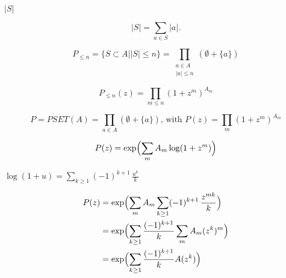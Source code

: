 \documentclass[10pt]{book}
\begin{document}
\begin{mdSnippets}
\begin{mdInlineSnippet}%
$|S|$\end{mdInlineSnippet}%
\begin{mdDisplaySnippet}[c1ab68d317b7b263fb9e31604987145d]%
\[%
|S|=\sum_{a\in S}|a|.
\]%
\end{mdDisplaySnippet}%
\begin{mdDisplaySnippet}%
\[%
P_{\leq n} = \{S\subset A||S|\leq n\} = \prod_{\substack{a\in A\\|a|\leq n}}(\emptyset+\{a\})
\]%
\end{mdDisplaySnippet}%
\begin{mdDisplaySnippet}[ab45d3bfb9608582184520ca67f39f00]%
\[%
P_{\leq n}(z)=\prod_{m\leq n}(1+z^m)^{A_m}
\]%
\end{mdDisplaySnippet}%
\begin{mdDisplaySnippet}[3629cc0747588690e68ca5fb992aa1e4]%
\[%
P=PSET(A)=\prod_{a\in A}(\emptyset + \{a\})\text{, with }
P(z)=\prod_{m}(1+z^m)^{A_m} 
\]%
\end{mdDisplaySnippet}%
\begin{mdDisplaySnippet}%
\[%
P(z) = \exp\Bigl(\sum_m A_m\log(1+z^m)\Bigr)
\]%
\end{mdDisplaySnippet}%
\begin{mdInlineSnippet}%
$\log(1+u)=\sum_{k\geq 1}(-1)^{k+1}\,\frac{u^k}{k}$\end{mdInlineSnippet}%
\begin{mdDisplaySnippet}[f62d677497515d977793cce77a1f1d21]%
\[%
\begin{aligned}
P(z) & = \exp\Bigl(\sum_m A_m\sum_{k\geq1}(-1)^{k+1}\,\frac{z^{mk}}{k}\Bigr)\\
     & = \exp\Bigl(\sum_{k\geq1}\frac{(-1)^{k+1}}{k}\sum_m A_m (z^k)^m\Bigr)\\
     & = \exp\Bigl(\sum_{k\geq1}\frac{(-1)^{k+1}}{k} A(z^k)\Bigr) 
\end{aligned}
\]%
\end{mdDisplaySnippet}%

\end{mdSnippets}
\end{document}
